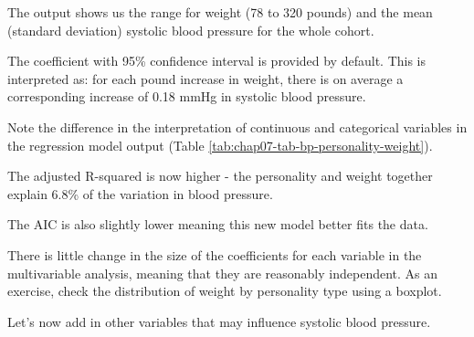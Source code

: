 \documentclass[
  12pt,
  krantz2]{krantz}
\makeatletter
\newenvironment{Shaded}{\begin{snugshade}}{\end{snugshade}}
\newcommand{\DataTypeTok}[1]{\textcolor[rgb]{0.13,0.29,0.53}{#1}}
\newcommand{\KeywordTok}[1]{\textcolor[rgb]{0.13,0.29,0.53}{\textbf{#1}}}
\newcommand{\NormalTok}[1]{#1}
\newcommand{\OperatorTok}[1]{\textcolor[rgb]{0.81,0.36,0.00}{\textbf{#1}}}
\newcommand{\OtherTok}[1]{\textcolor[rgb]{0.56,0.35,0.01}{#1}}
\newcommand{\StringTok}[1]{\textcolor[rgb]{0.31,0.60,0.02}{#1}}
\newenvironment{kframe}{%
\medskip{}
\setlength{\fboxsep}{.8em}
 \def\at@end@of@kframe{}%
 \ifinner\ifhmode%
  \def\at@end@of@kframe{\end{minipage}}%
  \begin{minipage}{\columnwidth}%
 \fi\fi%
 \def\FrameCommand##1{\hskip\@totalleftmargin \hskip-\fboxsep
 \colorbox{shadecolor}{##1}\hskip-\fboxsep
     \hskip-\linewidth \hskip-\@totalleftmargin \hskip\columnwidth}%
 \MakeFramed {\advance\hsize-\width
   \@totalleftmargin\z@ \linewidth\hsize
   \@setminipage}}%
 {\par\unskip\endMakeFramed%
 \at@end@of@kframe}
\renewenvironment{Shaded}{\begin{kframe}}{\end{kframe}}
\makeatother
\begin{document}
\begin{table}[!h]

\caption{\label{tab:chap07-tab-bp-personality-weight2}Multivariable linear regression metrics: Systolic blood pressure by personality type and weight.}
\centering
{}
\end{table}

The output shows us the range for weight (78 to 320 pounds) and the mean (standard deviation) systolic blood pressure for the whole cohort.

The coefficient with 95\% confidence interval is provided by default.
This is interpreted as: for each pound increase in weight, there is on average a corresponding increase of 0.18 mmHg in systolic blood pressure.

Note the difference in the interpretation of continuous and categorical variables in the regression model output (Table \ref{tab:chap07-tab-bp-personality-weight}).

The adjusted R-squared is now higher - the personality and weight together explain 6.8\% of the variation in blood pressure.

The AIC is also slightly lower meaning this new model better fits the data.

There is little change in the size of the coefficients for each variable in the multivariable analysis, meaning that they are reasonably independent.
As an exercise, check the distribution of weight by personality type using a boxplot.

Let's now add in other variables that may influence systolic blood pressure.

\begin{Shaded}
\end{Shaded}
\end{document}
